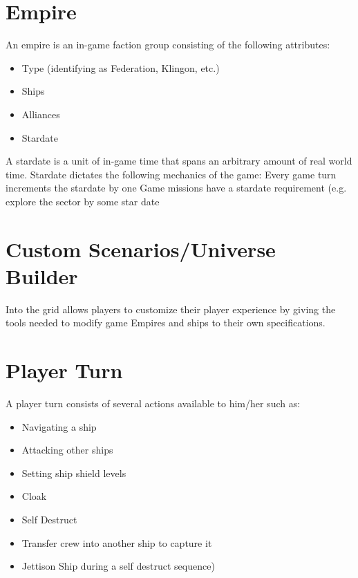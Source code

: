 \section{Empire}

An empire is an in-game faction group consisting of the following attributes:
\begin{itemize}
	\item Type (identifying as Federation, Klingon, etc.)
	\item Ships
	\item Alliances
	\item Stardate
\end{itemize}

 A stardate is a unit of in-game time that spans an arbitrary amount of real world time. Stardate dictates the following mechanics of the game:
 Every game turn increments the stardate by one
 Game missions have a stardate requirement (e.g. explore the sector by some star date

\section{Custom Scenarios/Universe Builder}

Into the grid allows players to customize their player experience by giving the tools needed to modify game Empires and ships to their own specifications.

\section{Player Turn}

A player turn consists of several actions available to him/her such as:

\begin{itemize}
	\item Navigating a ship
	\item Attacking other ships
	\item Setting ship shield levels
	\item Cloak
	\item Self Destruct
	\item Transfer crew into another ship to capture it
	\item Jettison Ship during a self destruct sequence)
\end{itemize}
